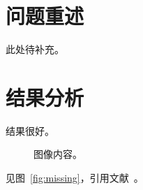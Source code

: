 \documentclass{ctexart}
\begin{document}
\section{问题重述}
此处待补充。
\section{结果分析}
结果很好。
\begin{figure}[htbp]
图像内容。
\end{figure}
见图~\ref{fig:missing}，引用文献~\cite{missing}。
\end{document}

